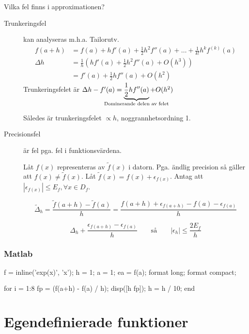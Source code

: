 \documentclass[a4paper,10pt,swedish]{memoir}
\numberwithin{equation}{subsection}
\begin{document}
Vilka fel finns i approximationen?

\begin{description}
\item[Trunkeringsfel]
  kan analyseras m.h.a. Tailorutv.
  \begin{align}
    f(a+h) &= f(a) + h f'(a) + \frac{1}{2}h^2 f''(a) + \ldots +
    \frac{1}{k!} h^kf^{(k)}(a) \\
    \Delta h &= \frac{1}{h}\left(h f'(a) + \frac{1}{2}h^2 f''(a) + O\left(h^3\right)\right) \\
    &= f'(a)+\frac{1}{2}h f''(a) + O(h^2)
  \end{align}
  Trunkeringsfelet är $\Delta h - f'(a)=\underbrace{\frac{1}{2}h f''(a)}_{\mathclap{\text{Dominerande delen av felet}}}+O(h^2)$

  Således är trunkeringsfelet $\propto h$, noggrannhetsordning 1.
\item[Precisionsfel] är fel pga. fel i funktionsvärdena.

Låt $f(x)$ representeras av $\tilde{f}(x)$ i datorn. Pga. ändlig precision så gäller att $f(x)\neq\tilde{f}(x)$. Låt $\tilde{f}(x)=f(x)+\epsilon_{f(x)}$. Antag att $|\epsilon_{f(x)}|\leq E_f, \forall x \in D_f$.

\begin{equation}
\tilde{\Delta}_h = \frac{\tilde{f}(a+h)-\tilde{f}(a)}{h} =
\frac{f(a+h) + \epsilon_{f(a+h)} - f(a) - \epsilon_{f(a)}}{h}
\end{equation}

\begin{equation}
\Delta_h + \frac{\epsilon_{f(a+h)}-\epsilon_{f(a)}}{h} \qquad \text{så} \qquad |\epsilon_h| \leq \frac{2 E_f}{h}
\end{equation}
\end{description}

\subsubsection{Matlab}

\begin{matlabcode}
f = inline('exp(x)', 'x');
h = 1; a = 1; ea = f(a); format long; format compact;

for i = 1:8
    fp = (f(a+h) - f(a) / h);
    disp([h fp]);
    h = h / 10;
end
\end{matlabcode}

\section{Egendefinierade funktioner}
\end{document}
